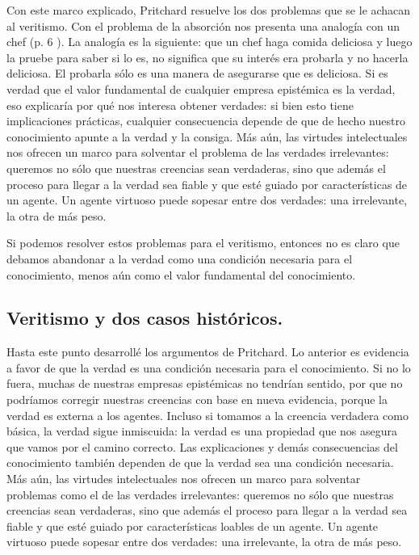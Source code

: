 \documentclass[12pt]{article}
\begin{document}
Con este marco explicado, Pritchard resuelve los dos problemas que se le achacan al veritismo. Con el problema de la absorción nos presenta una analogía con un chef (p. 6 ). La analogía es la siguiente: que un chef haga comida deliciosa y luego la pruebe para saber si lo es, no significa que su interés era probarla y no hacerla deliciosa. El probarla sólo es una manera de asegurarse que es deliciosa. Si es verdad que el valor fundamental de cualquier empresa epistémica es la verdad, eso explicaría por qué nos interesa obtener verdades: si bien esto tiene implicaciones prácticas, cualquier consecuencia depende de que de hecho nuestro conocimiento apunte a la verdad y la consiga. Más aún, las virtudes intelectuales nos ofrecen un marco para solventar el problema de las verdades irrelevantes: queremos no sólo que nuestras creencias sean verdaderas, sino que además el proceso para llegar a la verdad sea fiable y que esté guiado por características de un agente. Un agente virtuoso puede sopesar entre dos verdades: una irrelevante, la otra de más peso.

Si podemos resolver estos problemas para el veritismo, entonces no es claro que debamos abandonar a la verdad como una condición necesaria para el conocimiento, menos aún como el valor fundamental del conocimiento.


\subsection{Veritismo y dos casos históricos.}

\noindent Hasta este punto desarrollé los argumentos de Pritchard. Lo anterior es evidencia a favor de que la verdad es una condición necesaria para el conocimiento. Si no lo fuera, muchas de nuestras empresas epistémicas no tendrían sentido, por que no podríamos corregir nuestras creencias con base en nueva evidencia, porque la verdad es externa a los agentes. Incluso si tomamos a la creencia verdadera como básica, la verdad sigue inmiscuida: la verdad es una propiedad que nos asegura que vamos por el camino correcto. Las explicaciones y demás consecuencias del conocimiento también dependen de que la verdad sea una condición necesaria. Más aún, las virtudes intelectuales nos ofrecen un marco para solventar problemas como el de las verdades irrelevantes: queremos no sólo que nuestras creencias sean verdaderas, sino que además el proceso para llegar a la verdad sea fiable y que esté guiado por características loables de un agente. Un agente virtuoso puede sopesar entre dos verdades: una irrelevante, la otra de más peso.
\end{document}
